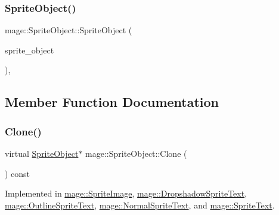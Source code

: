 \hypertarget{classmage_1_1_sprite_object_ab4207c10cd0324cec9a278cd1dac5c46}{}\label{classmage_1_1_sprite_object_ab4207c10cd0324cec9a278cd1dac5c46} 
\subsubsection{\texorpdfstring{Sprite\+Object()}{SpriteObject()}\hspace{0.1cm}{\footnotesize\ttfamily [3/3]}}
{\footnotesize\ttfamily mage\+::\+Sprite\+Object\+::\+Sprite\+Object (\begin{DoxyParamCaption}\item[{\hyperlink{classmage_1_1_sprite_object}{Sprite\+Object} \&\&}]{sprite\+\_\+object }\end{DoxyParamCaption})\hspace{0.3cm}{\ttfamily [protected]}, {\ttfamily [default]}}



\subsection{Member Function Documentation}
\hypertarget{classmage_1_1_sprite_object_a556c1ffcf4015ba4f8a803974b53ca88}{}\label{classmage_1_1_sprite_object_a556c1ffcf4015ba4f8a803974b53ca88} 
\subsubsection{\texorpdfstring{Clone()}{Clone()}}
{\footnotesize\ttfamily virtual \hyperlink{classmage_1_1_sprite_object}{Sprite\+Object}$\ast$ mage\+::\+Sprite\+Object\+::\+Clone (\begin{DoxyParamCaption}{ }\end{DoxyParamCaption}) const\hspace{0.3cm}{\ttfamily [pure virtual]}}



Implemented in \hyperlink{classmage_1_1_sprite_image_abcb2aab6730c2bdb28ab1e95ae9e2933}{mage\+::\+Sprite\+Image}, \hyperlink{classmage_1_1_dropshadow_sprite_text_a116c49fb9638414c67a09501c4031a01}{mage\+::\+Dropshadow\+Sprite\+Text}, \hyperlink{classmage_1_1_outline_sprite_text_a095a8ef1603b9045cecb6fd1263243be}{mage\+::\+Outline\+Sprite\+Text}, \hyperlink{classmage_1_1_normal_sprite_text_aef48e90667849cd9ec01510baf1394cb}{mage\+::\+Normal\+Sprite\+Text}, and \hyperlink{classmage_1_1_sprite_text_ac4edf927911a9fb8e5c3a674b217637a}{mage\+::\+Sprite\+Text}.

